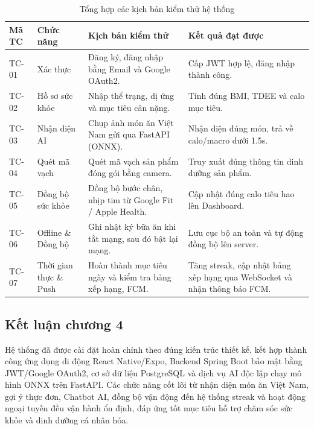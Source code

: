 \documentclass[../main.tex]{subfiles}
\begin{document}
\begin{table}[H]
    \centering
    \caption{Tổng hợp các kịch bản kiểm thử hệ thống}
    \label{tab:ch4_testcases}
    \begin{tabular}{|p{}|p{}|p{}|p{}|}
        \hline
        \rowcolor{primary!35}
        \textbf{Mã TC} & \textbf{Chức năng} & \textbf{Kịch bản kiểm thử} & \textbf{Kết quả đạt được} \\
        \hline
        TC-01 & Xác thực & Đăng ký, đăng nhập bằng Email và Google OAuth2. & Cấp JWT hợp lệ, đăng nhập thành công. \\
        \hline
        TC-02 & Hồ sơ sức khỏe & Nhập thể trạng, dị ứng và mục tiêu cân nặng. & Tính đúng BMI, TDEE và calo mục tiêu. \\
        \hline
        TC-03 & Nhận diện AI & Chụp ảnh món ăn Việt Nam gửi qua FastAPI (ONNX). & Nhận diện đúng món, trả về calo/macro dưới 1.5s. \\
        \hline
        TC-04 & Quét mã vạch & Quét mã vạch sản phẩm đóng gói bằng camera. & Truy xuất đúng thông tin dinh dưỡng sản phẩm. \\
        \hline
        TC-05 & Đồng bộ sức khỏe & Đồng bộ bước chân, nhịp tim từ Google Fit / Apple Health. & Cập nhật đúng calo tiêu hao lên Dashboard. \\
        \hline
        TC-06 & Offline \& Đồng bộ & Ghi nhật ký bữa ăn khi tắt mạng, sau đó bật lại mạng. & Lưu cục bộ an toàn và tự động đồng bộ lên server. \\
        \hline
        TC-07 & Thời gian thực \& Push & Hoàn thành mục tiêu ngày và kiểm tra bảng xếp hạng, FCM. & Tăng streak, cập nhật bảng xếp hạng qua WebSocket và nhận thông báo FCM. \\
        \hline
    \end{tabular}
\end{table}

\subsection{Kết luận chương 4}

Hệ thống đã được cài đặt hoàn chỉnh theo đúng kiến trúc thiết kế, kết hợp thành công ứng dụng di động React Native/Expo, Backend Spring Boot bảo mật bằng JWT/Google OAuth2, cơ sở dữ liệu PostgreSQL và dịch vụ AI độc lập chạy mô hình ONNX trên FastAPI. Các chức năng cốt lõi từ nhận diện món ăn Việt Nam, gợi ý thực đơn, Chatbot AI, đồng bộ vận động đến hệ thống streak và hoạt động ngoại tuyến đều vận hành ổn định, đáp ứng tốt mục tiêu hỗ trợ chăm sóc sức khỏe và dinh dưỡng cá nhân hóa.
\end{document}
